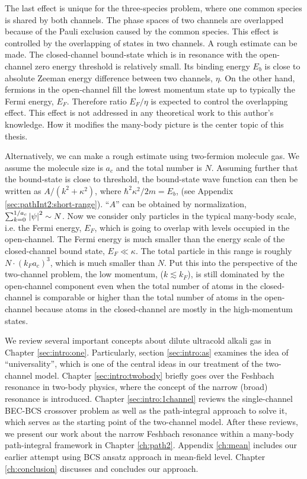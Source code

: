 The last effect is unique for the three-species problem, where one common species is shared by both channels.  The phase spaces of two channels are overlapped because of the Pauli exclusion caused by the common species. This effect is controlled by the overlapping of states in two channels. A rough estimate can be made.  The closed-channel bound-state which is in resonance with the open-channel zero energy threshold is relatively small.  Its binding energy $E_b$ is close to absolute Zeeman energy difference between two channels, $\eta$.  On the other hand, fermions in the open-channel fill the lowest  momentum state up to typically the Fermi energy, $E_F$.  Therefore ratio $E_F/\eta$ is expected to control the overlapping effect. This effect is not addressed in any theoretical work to this author's knowledge.  How it modifies the many-body picture is the center topic of this thesis. 

Alternatively, we can make a rough estimate using two-fermion molecule gas. We assume the molecule size is $a_{c}$ and the total number is $N$.  Assuming further that the bound-state is close to threshold,   the bound-state wave function can then be written as $A/(k^{2}+\kappa^{2})$, where $\hbar^{2}\kappa^{2}/2m=E_{b}$, (see Appendix \ref{sec:pathInt2:short-range}). ``$A$'' can be obtained by normalization, $\sum_{k=0}^{1/a_{c}}\left\lvert{\psi}\right\rvert^{2}\sim{}N$. Now  we consider only particles in the typical many-body scale, i.e. the Fermi energy, $E_{F}$, which is going to overlap with levels occupied in the open-channel. The Fermi energy is much smaller than the energy scale of the closed-channel bound state, $E_{F}\ll\kappa$.  The total particle in this range is roughly $N\cdot(k_{F}a_{c})^{3}$, which is much smaller than $N$. Put this into the perspective of the two-channel problem, the low momentum,  ($k\lesssim{}k_F$), is still dominated by the open-channel component even when the total number of atoms in the closed-channel is comparable or higher than the total number  of atoms in the open-channel because atoms in the closed-channel are mostly in the high-momentum states.     

 We review several important concepts about dilute ultracold alkali gas in Chapter \ref{sec:intro:one}.  Particularly, section \ref{sec:intro:as} examines the idea of ``universality'', which is one of the central ideas in our treatment of the two-channel model.  Chapter \ref{sec:intro:twobody} briefly goes over the Feshbach resonance in two-body physics, where the concept of  the narrow (broad) resonance is introduced. Chapter \ref{sec:intro:1channel} reviews the single-channel BEC-BCS crossover problem as well as the path-integral approach to solve it, which serves as the starting point of the two-channel model. After these reviews, we present our work about the narrow Feshbach resonance within a many-body path-integral framework in  Chapter \ref{ch:path2}.   Appendix \ref{ch:mean} includes our earlier attempt   using BCS ansatz  approach in mean-field level.  Chapter \ref{ch:conclusion} discusses and concludes our approach.  

